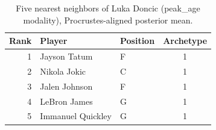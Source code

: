 \begin{table}[htbp]
  \centering\small
  \begin{tabular}{rllc}
    \toprule
    Rank & Player & Position & Archetype \\
    \midrule
    1 & Jayson Tatum & F & 1 \\
    2 & Nikola Jokic & C & 1 \\
    3 & Jalen Johnson & F & 1 \\
    4 & LeBron James & G & 1 \\
    5 & Immanuel Quickley & G & 1 \\
    \bottomrule
  \end{tabular}
  \caption{Five nearest neighbors of Luka Doncic (peak_age modality), Procrustes-aligned posterior mean.}
  \label{tab:Luka_Doncic_neighbors_peak_age}
\end{table}

